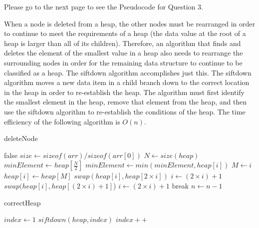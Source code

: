\documentclass{article}
\begin{document}
Please go to the next page to see the Pseudocode for Question 3.

When a node is deleted from a heap, the other nodes must be rearranged in order to continue to meet the requirements of a heap (the data value at the root of a heap is larger than all of its children). Therefore, an algorithm that finds and deletes the element of the smallest value in a heap also needs to rearrange the surrounding nodes in order for the remaining data structure to continue to be classified as a heap. The siftdown algorithm accomplishes just this. The siftdown algorithm moves a new data item in a child branch down to the correct location in the heap in order to re-establish the heap. The algorithm must first identify the smallest element in the heap, remove that element from the heap, and then use the siftdown algorithm to re-establish the conditions of the heap. The time efficiency of the following algorithm is $O(n)$.

\begin{algorithm}
\caption{deleteNode}\label{alg:cap}
\begin{algorithmic}
\State \Return false
\Else
\State $size \gets sizeof(arr) / sizeof(arr[0])$
\State $N \gets size(heap)$
\State $minElement \gets heap[\frac{N}{2}]$
\State $minElement \gets min(minElement, heap[i])$
\EndFor
{}
\State $M \gets i$
\State $heap[i] \gets heap[M]$
\EndIf
\EndFor
{}
\State $swap(heap[i], heap[2 \times i])$
\State $i \gets (2 \times i)+1$
\State $swap(heap[i], heap[(2 \times i)+1]$)
\State $i \gets (2 \times i)+1$
\Else
\State break
\EndIf
\EndFor
\State $n \gets n-1$
\EndIf
\end{algorithmic}
\end{algorithm}

\begin{algorithm}
\caption{correctHeap}\label{alg:cap}
\begin{algorithmic}
\State $index \gets 1$
\State $siftdown(heap, index)$
\State $index++$
\EndWhile
\end{algorithmic}
\end{algorithm}
\end{document}
